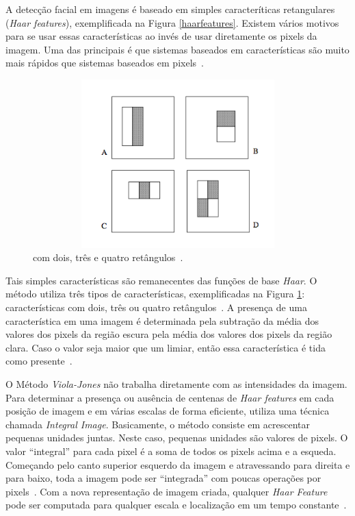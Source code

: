 A detecção facial em imagens é baseado em simples caracteríticas retangulares (\textit{Haar features}), exemplificada na Figura \ref{haarfeatures}. Existem vários motivos para se usar essas características ao invés de usar diretamente os pixels da imagem. Uma das principais é que sistemas baseados em características são muito mais rápidos que sistemas baseados em pixels~\cite{violajones}. 

\begin{figure}[hbt]
		\begin{center}
			\includegraphics[height=6.5cm,width=12.5cm]{figuras/2.FundamentacaoTeorica/haarfeaturestypes.png}
		\end{center}
		\caption{ com dois, três e quatro retângulos~\cite{violajones}.}
		\label{haarfeaturestypes}
	\end{figure}

Tais simples características são remanecentes das funções de base \textit{Haar}. O método utiliza três tipos de características, exemplificadas na Figura \ref{haarfeaturestypes}: características com dois, três ou quatro retângulos~\cite{violajones}. A presença de uma característica em uma imagem é determinada pela subtração da média dos valores dos pixels da região escura pela média dos valores dos pixels da região clara. Caso o valor seja maior que um limiar, então essa característica é tida como presente~\cite{servodetection}.

O Método \textit{Viola-Jones} não trabalha diretamente com as intensidades da imagem. Para determinar a presença ou ausência de centenas de \textit{Haar features} em cada posição de imagem e em várias escalas de forma eficiente, utiliza uma técnica chamada \textit{Integral Image}. Basicamente, o método consiste em acrescentar pequenas unidades juntas. Neste caso, pequenas unidades são valores de pixels. O valor ``integral'' para cada pixel é a soma de todos os pixels acima e a esqueda. Começando pelo canto superior esquerdo da imagem e atravessando para direita e para baixo, toda a imagem pode ser ``integrada'' com poucas operações por pixels~\cite{servodetection, violajones}. Com a nova representação de imagem criada, qualquer \textit{Haar Feature} pode ser computada para qualquer escala e localização em um tempo constante~\cite{violajones}.

